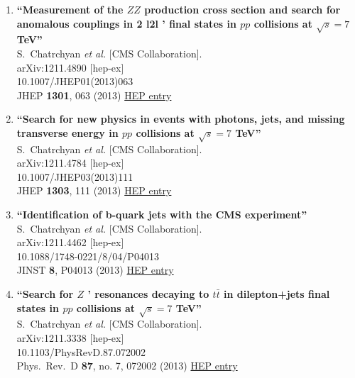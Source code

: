 \documentclass{article}
\begin{document}
\begin{enumerate}
\item%
{\bf ``Measurement of the $ZZ$ production cross section and search for anomalous couplings in 2 l2l ' final states in $pp$ collisions at $\sqrt{s}=7$ TeV''}
  \\{}S.~Chatrchyan {\it et al.} [CMS Collaboration].
  \\{}arXiv:1211.4890 [hep-ex]
    \\{}10.1007/JHEP01(2013)063
\\{}JHEP {\bf 1301}, 063 (2013) %
\href{http://inspirehep.net/record/1203454}{HEP entry}


\item%
{\bf ``Search for new physics in events with photons, jets, and missing transverse energy in $pp$ collisions at $\sqrt{s}=7$ TeV''}
  \\{}S.~Chatrchyan {\it et al.} [CMS Collaboration].
  \\{}arXiv:1211.4784 [hep-ex]
    \\{}10.1007/JHEP03(2013)111
\\{}JHEP {\bf 1303}, 111 (2013) %
\href{http://inspirehep.net/record/1203307}{HEP entry}


\item%
{\bf ``Identification of b-quark jets with the CMS experiment''}
  \\{}S.~Chatrchyan {\it et al.} [CMS Collaboration].
  \\{}arXiv:1211.4462 [hep-ex]
    \\{}10.1088/1748-0221/8/04/P04013
\\{}JINST {\bf 8}, P04013 (2013) %
\href{http://inspirehep.net/record/1203133}{HEP entry}


\item%
{\bf ``Search for $Z$ ' resonances decaying to $t\bar{t}$ in dilepton+jets final states in $pp$ collisions at $\sqrt{s}=7$ TeV''}
  \\{}S.~Chatrchyan {\it et al.} [CMS Collaboration].
  \\{}arXiv:1211.3338 [hep-ex]
    \\{}10.1103/PhysRevD.87.072002
\\{}Phys.\ Rev.\ D {\bf 87}, no. 7, 072002 (2013) %
\href{http://inspirehep.net/record/1202680}{HEP entry}



\end{enumerate}
\end{document}
